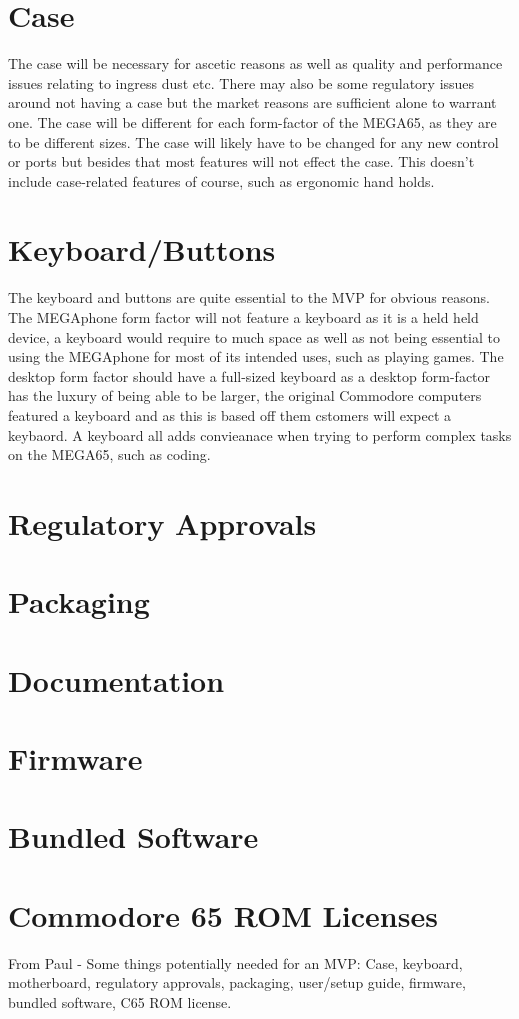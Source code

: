 \section{Case}
The case will be necessary for ascetic reasons as well as quality and performance issues relating to ingress dust etc. There may also be some regulatory issues around not having a case but the market reasons are sufficient alone to warrant one. The case will be different for each form-factor of the MEGA65, as they are to be different sizes. The case will likely have to be changed for any new control or ports but besides that most features will not effect the case. This doesn't include case-related features of course, such as ergonomic hand holds.


\section{Keyboard/Buttons}
The keyboard and buttons are quite essential to the MVP for obvious reasons. The MEGAphone form factor will not feature a keyboard as it is a held held device, a keyboard would require to much space as well as not being essential to using the MEGAphone for most of its intended uses, such as playing games. The desktop form factor should have a full-sized keyboard as a desktop form-factor has the luxury of being able to be larger, the original Commodore computers featured a keyboard and as this is based off them cstomers will expect a keybaord. A keyboard all adds convieanace when trying to perform complex tasks on the MEGA65, such as coding.


\section{Regulatory Approvals}

\section{Packaging}

\section{Documentation}

\section{Firmware}

\section{Bundled Software}

\section{Commodore 65 ROM Licenses}


From Paul - 
Some things potentially needed for an MVP: Case, keyboard, motherboard, regulatory approvals, packaging, user/setup guide, firmware, bundled software, C65 ROM license.

